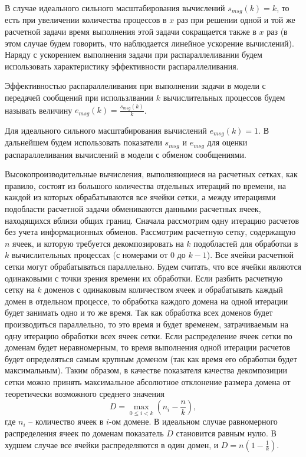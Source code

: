 В случае идеального сильного масштабирования вычислений $s_{msg}(k) = k$, то есть при увеличении количества процессов в $x$ раз при решении одной и той же расчетной задачи время выполнения этой задачи сокращается также в $x$ раз (в этом случае будем говорить, что наблюдается линейное ускорение вычислений).
Наряду с ускорением выполнения задачи при распараллеливании будем использовать характеристику эффективности распараллеливания.

\begin{definition}
Эффективностью распараллеливания при выполнении задачи в модели с передачей сообщений при использлвании $k$ вычислительных процессов будем называть величину $e_{msg}(k) = \frac{s_{msg}(k)}{k}$.
\end{definition}

Для идеального сильного масштабирования вычислений $e_{msg}(k) = 1$.
В дальнейшем будем использовать показатели $s_{msg}$ и $e_{msg}$ для оценки распараллеливания вычислений в модели с обменом сообщениями.

Высокопроизводительные вычисления, выполняющиеся на расчетных сетках, как правило, состоят из большого количества отдельных итераций по времени, на каждой из которых обрабатываются все ячейки сетки, а между итерациями подобласти расчетной задачи обмениваются данными расчетных ячеек, находящихся вблизи общих границ.
Сначала рассмотрим одну итерацию расчетов без учета информационных обменов.
Рассмотрим расчетную сетку, содержащую $n$ ячеек, и которую требуется декомпозировать на $k$ подобластей для обработки в $k$ вычислительных процессах (с номерами от $0$ до $k - 1$).
Все ячейки расчетной сетки могут обрабатываться параллельно.
Будем считать, что все ячейки являются одинаковыми с точки зрения времени их обработки.
Если разбить расчетную сетку на $k$ доменов с одинаковым количеством ячеек и обрабатывать каждый домен в отдельном процессе, то обработка каждого домена на одной итерации будет занимать одно и то же время.
Так как обработка всех доменов будет производиться параллельно, то это время и будет временем, затрачиваемым на одну итерацию обработки всех ячеек сетки.
Если распределение ячеек сетки по доменам будет неравномерным, то время выполнения одной итерации расчетов будет определяться самым крупным доменом (так как время его обработки будет максимальным).
Таким образом, в качестве показателя качества декомпозиции сетки можно принять максимальное абсолютное отклонение размера домена от теоретически возможного среднего значения
\begin{equation}
	D = \max_{0 \le i < k}{ \left( n_i - \frac{n}{k} \right) },
\end{equation}
где $n_i$ – количество ячеек в $i$-ом домене.
В идеальном случае равномерного распределения ячеек по доменам показатель $D$ становится равным нулю.
В худшем случае все ячейки распределяются в один домен, и $D = n \left( 1 - \frac{1}{k} \right)$.

